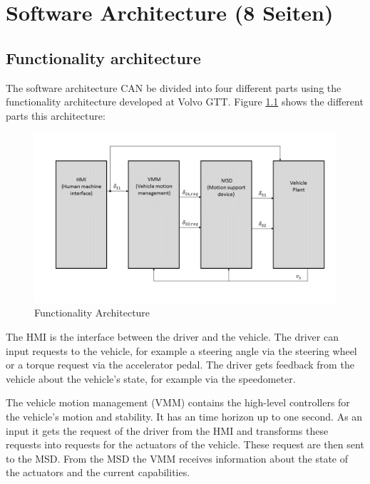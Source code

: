 \documentclass[ExampleMasters.tex]{subfiles}
\begin{document}
\clearpage


\chapter{Software Architecture (8 Seiten)}
\label{chap:software_setup}

\section{Functionality architecture}
\label{sec:func_architecture}

The software architecture \gls{CAN} be divided into four different parts using the functionality architecture developed at Volvo GTT. Figure \ref{fig:funct_architecture} shows the different parts this architecture:

\begin{figure}[h]
\centering
\includegraphics[width=1\linewidth]{figures/functionality_architecture}

\caption{Functionality Architecture}
\label{fig:funct_architecture}
\end{figure}

The \gls{HMI} is the interface between the driver and the vehicle. The driver can input requests to the vehicle, for example a steering angle via the steering wheel or a torque request via the accelerator pedal. The driver gets feedback from the vehicle about the vehicle's state, for example via the speedometer.

The vehicle motion management (VMM) contains the high-level controllers for the vehicle's motion and stability. It has an time horizon up to one second. As an input it gets the request of the driver from the \gls{HMI} and transforms these requests into requests for the actuators of the vehicle. These request are then sent to the \gls{MSD}. From the \gls{MSD} the \gls{VMM} receives information about the state of the actuators and the current capabilities.
\end{document}
